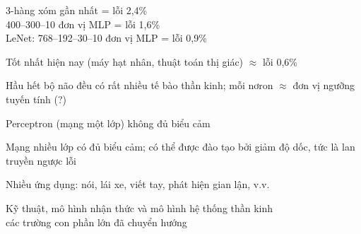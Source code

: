 \documentclass{article}
\begin{document}
\begin{huge}
3-hàng xóm gần nhất = lỗi 2,4\% \\
400--300--10 đơn vị MLP = lỗi 1,6\%\\
LeNet: 768--192--30--10 đơn vị MLP = lỗi 0,9\%

Tốt nhất hiện nay (máy hạt nhân, thuật toán thị giác) $\approx$ lỗi 0,6\%



Hầu hết bộ não đều có rất nhiều tế bào thần kinh; mỗi nơron $\approx$ đơn vị ngưỡng tuyến tính (?)

Perceptron (mạng một lớp) không đủ biểu cảm

Mạng nhiều lớp có đủ biểu cảm; có thể được đào tạo bởi 
giảm độ dốc, tức là lan truyền ngược lỗi

Nhiều ứng dụng: nói, lái xe, viết tay, phát hiện gian lận, v.v.

Kỹ thuật, mô hình nhận thức và mô hình hệ thống thần kinh\\
các trường con phần lớn đã chuyển hướng

\end{huge}
\end{document}
